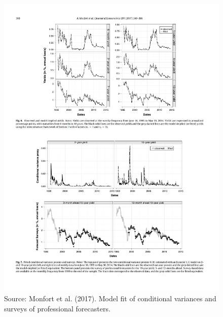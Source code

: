 \documentclass[
  12pt,
]{book}
\theoremstyle{definition}
\theoremstyle{definition}
\theoremstyle{definition}
\theoremstyle{definition}
\theoremstyle{remark}
\begin{document}
\begin{figure}

{\centering \includegraphics[width=0.95\linewidth]{figures/Figure_fit_ZARG} 

}

\caption{Source: Monfort et al. (2017). Model fit of conditional variances and surveys of professional forecasters.}\label{fig:fitZarg}
\end{figure}
\end{document}
